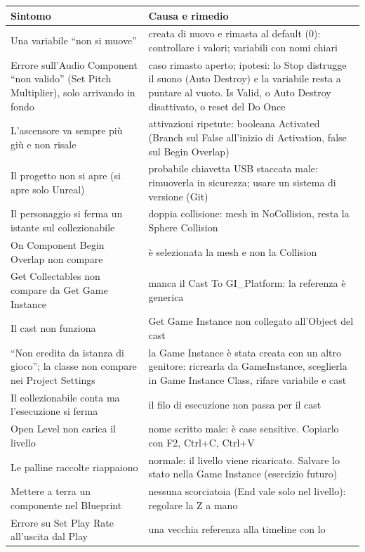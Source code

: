 \begin{table}[htbp]
\centering
\small
\begin{tabular}{@{}p{5.4cm}p{8.6cm}@{}}
\toprule
\textbf{Sintomo} & \textbf{Causa e rimedio} \\
\midrule
Una variabile ``non si muove'' & creata di nuovo e rimasta al default (0): controllare i
valori; variabili con nomi chiari \\
Errore sull'Audio Component ``non valido'' (Set Pitch Multiplier), solo arrivando in
fondo & caso rimasto aperto; ipotesi: lo Stop distrugge il suono (Auto Destroy) e la
variabile resta a puntare al vuoto. Is Valid, o Auto Destroy disattivato, o reset del Do
Once \\
L'ascensore va sempre più giù e non risale & attivazioni ripetute: booleana Activated
(Branch sul False all'inizio di Activation, false sul Begin Overlap) \\
Il progetto non si apre (si apre solo Unreal) & probabile chiavetta USB staccata male:
rimuoverla in sicurezza; usare un sistema di versione (Git) \\
Il personaggio si ferma un istante sul collezionabile & doppia collisione: mesh in
NoCollision, resta la Sphere Collision \\
On Component Begin Overlap non compare & è selezionata la mesh e non la Collision \\
Get Collectables non compare da Get Game Instance & manca il Cast To GI\_Platform: la
referenza è generica \\
Il cast non funziona & Get Game Instance non collegato all'Object del cast \\
``Non eredita da istanza di gioco''; la classe non compare nei Project Settings & la
Game Instance è stata creata con un altro genitore: ricrearla da GameInstance, sceglierla
in Game Instance Class, rifare variabile e cast \\
Il collezionabile conta ma l'esecuzione si ferma & il filo di esecuzione non passa per
il cast \\
Open Level non carica il livello & nome scritto male: è case sensitive. Copiarlo con F2,
Ctrl+C, Ctrl+V \\
Le palline raccolte riappaiono & normale: il livello viene ricaricato. Salvare lo stato
nella Game Instance (esercizio futuro) \\
Mettere a terra un componente nel Blueprint & nessuna scorciatoia (End vale solo nel
livello): regolare la Z a mano \\
Errore su Set Play Rate all'uscita dal Play & una vecchia referenza alla timeline con lo

\end{tabular}
\end{table}
